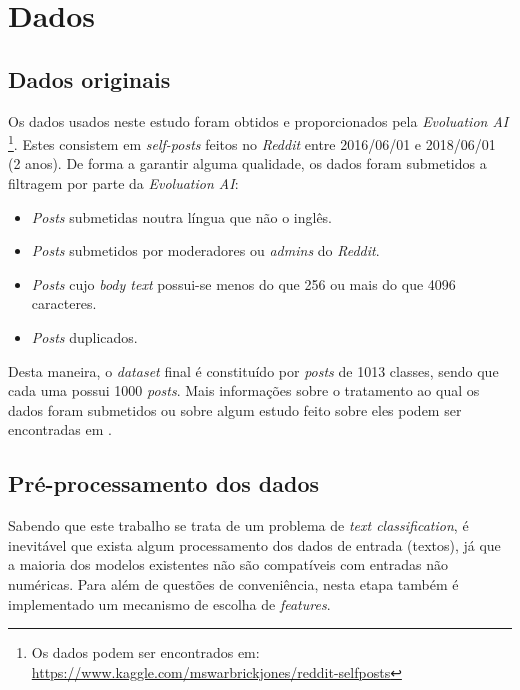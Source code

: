 \section{Dados}

\subsection{Dados originais}
Os dados usados neste estudo foram obtidos e proporcionados pela \textit{Evoluation AI} \footnote{Os dados podem ser encontrados em: \url{https://www.kaggle.com/mswarbrickjones/reddit-selfposts}}. Estes consistem em \textit{self-posts} feitos no \textit{Reddit} entre 2016/06/01 e 2018/06/01 (2 anos). De forma a garantir alguma qualidade, os dados foram submetidos a filtragem por parte da \textit{Evoluation AI}:
\begin{itemize}
    \item \textit{Posts} submetidas noutra língua que não o inglês.
    \item \textit{Posts} submetidos por moderadores ou \textit{admins} do \textit{Reddit}.
    \item \textit{Posts} cujo \textit{body text} possui-se menos do que 256 ou mais do que 4096 caracteres.
    \item \textit{Posts} duplicados.
\end{itemize}

Desta maneira, o \textit{dataset} final é constituído por \textit{posts} de 1013 classes, sendo que cada uma possui 1000 \textit{posts}. Mais informações sobre o tratamento ao qual os dados foram submetidos ou sobre algum estudo feito sobre eles podem ser encontradas em \cite{data_paper}.

\subsection{Pré-processamento dos dados}
\label{subsub:data_pre_processing}

Sabendo que este trabalho se trata de um problema de \textit{text classification}, é inevitável que exista algum processamento dos dados de entrada (textos), já que a maioria dos modelos existentes não são compatíveis com entradas não numéricas. Para além de questões de conveniência, nesta etapa também é implementado um mecanismo de escolha de \textit{features}.

